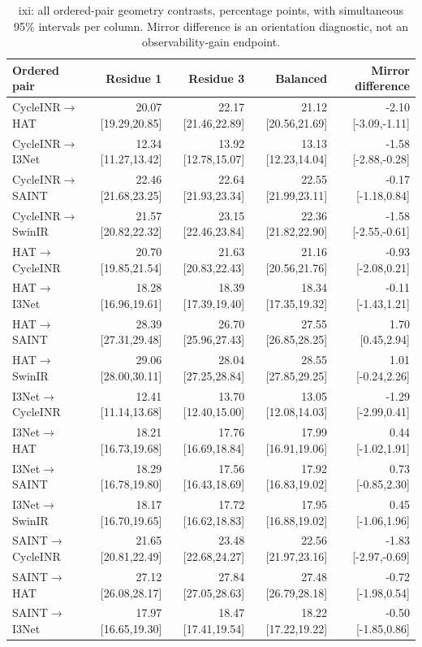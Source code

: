 \begin{table}[t]\centering\scriptsize
\caption{ixi: all ordered-pair geometry contrasts, percentage points, with simultaneous 95\% intervals per column. Mirror difference is an orientation diagnostic, not an observability-gain endpoint.}\label{tab:geometry-ixi}\setlength{\tabcolsep}{4pt}
\begin{tabular}{lrrrr}\toprule
Ordered pair & Residue 1 & Residue 3 & Balanced & Mirror difference\\\midrule
CycleINR$\to$HAT & 20.07 [19.29,20.85] & 22.17 [21.46,22.89] & 21.12 [20.56,21.69] & -2.10 [-3.09,-1.11] \\
CycleINR$\to$I3Net & 12.34 [11.27,13.42] & 13.92 [12.78,15.07] & 13.13 [12.23,14.04] & -1.58 [-2.88,-0.28] \\
CycleINR$\to$SAINT & 22.46 [21.68,23.25] & 22.64 [21.93,23.34] & 22.55 [21.99,23.11] & -0.17 [-1.18,0.84] \\
CycleINR$\to$SwinIR & 21.57 [20.82,22.32] & 23.15 [22.46,23.84] & 22.36 [21.82,22.90] & -1.58 [-2.55,-0.61] \\
HAT$\to$CycleINR & 20.70 [19.85,21.54] & 21.63 [20.83,22.43] & 21.16 [20.56,21.76] & -0.93 [-2.08,0.21] \\
HAT$\to$I3Net & 18.28 [16.96,19.61] & 18.39 [17.39,19.40] & 18.34 [17.35,19.32] & -0.11 [-1.43,1.21] \\
HAT$\to$SAINT & 28.39 [27.31,29.48] & 26.70 [25.96,27.43] & 27.55 [26.85,28.25] & 1.70 [0.45,2.94] \\
HAT$\to$SwinIR & 29.06 [28.00,30.11] & 28.04 [27.25,28.84] & 28.55 [27.85,29.25] & 1.01 [-0.24,2.26] \\
I3Net$\to$CycleINR & 12.41 [11.14,13.68] & 13.70 [12.40,15.00] & 13.05 [12.08,14.03] & -1.29 [-2.99,0.41] \\
I3Net$\to$HAT & 18.21 [16.73,19.68] & 17.76 [16.69,18.84] & 17.99 [16.91,19.06] & 0.44 [-1.02,1.91] \\
I3Net$\to$SAINT & 18.29 [16.78,19.80] & 17.56 [16.43,18.69] & 17.92 [16.83,19.02] & 0.73 [-0.85,2.30] \\
I3Net$\to$SwinIR & 18.17 [16.70,19.65] & 17.72 [16.62,18.83] & 17.95 [16.88,19.02] & 0.45 [-1.06,1.96] \\
SAINT$\to$CycleINR & 21.65 [20.81,22.49] & 23.48 [22.68,24.27] & 22.56 [21.97,23.16] & -1.83 [-2.97,-0.69] \\
SAINT$\to$HAT & 27.12 [26.08,28.17] & 27.84 [27.05,28.63] & 27.48 [26.79,28.18] & -0.72 [-1.98,0.54] \\
SAINT$\to$I3Net & 17.97 [16.65,19.30] & 18.47 [17.41,19.54] & 18.22 [17.22,19.22] & -0.50 [-1.85,0.86] \\

\end{tabular}
\end{table}
